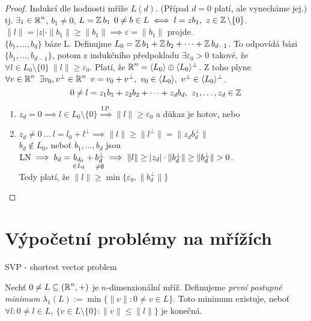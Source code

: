\begin{proof}
Indukcí dle hodnosti mříže $L(d)$. (Případ $d=0$ platí, ale vynecháme jej.) \\
 tj. $\exists _1 \in \operatorname{\mathbb{R}}^n$, $b_1\neq 0$, $L=\operatorname{\mathbb{Z}} b_1$ $0\neq b\in L\iff l=z b_1,\ z\in \operatorname{\mathbb{Z}}\setminus\{0\}$.\\
$\|l\|=|z|\cdot\|b_1\|\geq\|b_1\|\implies \varepsilon=\|b_1\|$ projde.\\
 $\{b_1,\ldots,b_d\}$ báze L. Definujme $L_0=\operatorname{\mathbb{Z}} b_1+\operatorname{\mathbb{Z}} b_2 + \cdots +\operatorname{\mathbb{Z}} b_{d-1}$. 
To odpovídá bázi $\{b_1,\ldots,b_{d-1}\}$, potom z indukčního předpokladu $\exists \varepsilon_0>0$ takové, že $\forall l\in L_0\setminus\{0\}\  \|l\|\geq \varepsilon_0$.
Platí, že $\operatorname{\mathbb{R}}^n=\langle L_0\rangle\oplus\langle L_0\rangle^\perp$. Z toho plyne $\forall v\in\Real^n\ \exists v_0, v^\perp\in\Real^n\ v=v_0+v^\perp,\ v_0\in\langle L_0\rangle,\ v^\perp\in\langle L_0 \rangle^\perp$.$$0\neq l = z_1 b_1+z_2 b_2+\cdots+z_d b_d,\ z_1,\ldots,z_d\in\Z$$

\begin{enumerate}
    \item $z_d=0\implies l\in L_0\setminus\{0\}\overset{\text{I.P.}}{\implies}\|l\|\geq \varepsilon_0$ a důkaz je hotov, nebo
    \item $z_d\neq0\ \ldots\ l=l_0+l^\perp\implies\|l\|\geq\|l^\perp\|=\|z_db_d^\perp\|$\\
    $b_d\notin L_0$, neboť $b_1,\ldots,b_d$ jsou $\LN\implies b_d=\underset{\in L_0}{b_{d_0}}+\underset{\neq\emptyset}{b_d^\perp} \implies \|l\|\geq|z_d|\cdot \|b_d^\perp\|\geq\|b_d^\perp\|>0$.\\
    Tedy platí, že $\|l\|\geq\min\{\varepsilon_0,\|b_d^\perp\|\}$
\end{enumerate}
\end{proof}

\section{\texorpdfstring{Výpočetní problémy na mřížích}{Vypocetni problemy na mrizich}}
SVP - shortest vector problem

\begin{definition}
Nechť $0\neq L\subseteq(\operatorname{\mathbb{R}}^n,+)$ je $n$-dimenzionální mříž. Definujeme \emph{první postupné minimum} 
$\lambda_1(L):=\min\{\|v\|:0\neq v\in L\}$. 
Toto minimum existuje, neboť $\forall l: 0\neq l\in L,\ \{v\in L\setminus\{0\}:\|v\|\leq\|l\|\}$ je konečná.
\end{definition}

